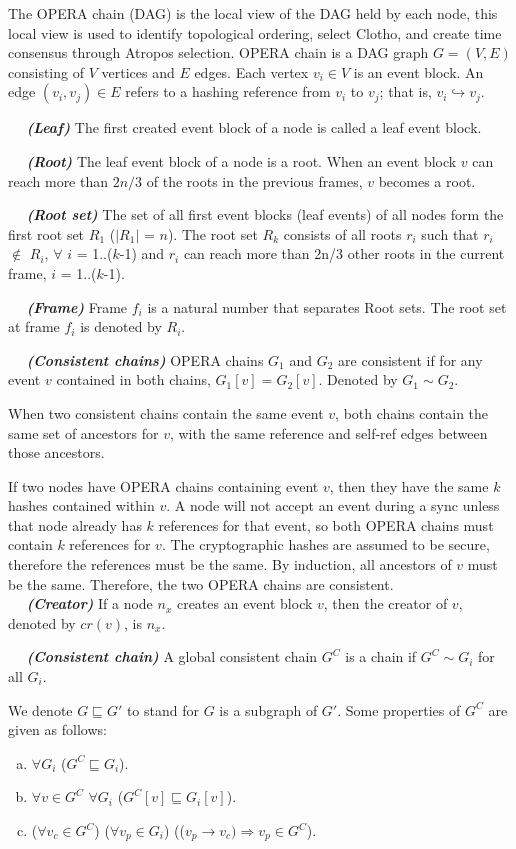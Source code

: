 \documentclass{article}
\newcommand{\dfnn}[2]{$\quad$ \textbf{\emph{(#1)}} {#2}}
\newcommand{\erefz}{\hookrightarrow}
\newcommand{\hbefore}{\rightarrow}
\begin{document}
The OPERA chain (DAG) is the local view of the DAG held by each node, this local view is used to identify topological ordering, select Clotho, and create time consensus through Atropos selection.
OPERA chain is a DAG graph $G = (V, E)$ consisting of $V$ vertices and $E$ edges. Each vertex $v_i \in V$ is an event block. An edge $(v_i,v_j) \in E$ refers to a hashing reference from $v_i$ to $v_j$; that is, $v_i \erefz v_j$.

\dfnn{Leaf}{The first created event block of a node is called a leaf event block.}

\dfnn{Root}{The leaf event block of a node is a root. When an event block $v$ can reach more than $2n/3$ of the roots in the previous frames, $v$ becomes a root.}

\dfnn{Root set}{The set of all first event blocks (leaf events) of all nodes form the first root set $R_1$ ($|R_1|$ = $n$). The root set $R_k$ consists of all roots $r_i$ such that $r_i$ $\not \in $ $R_i$, $\forall$ $i$ = 1..($k$-1) and $r_i$ can reach more than 2n/3 other roots in the current frame, $i$ = 1..($k$-1).}

\dfnn{Frame}{Frame $f_i$ is a natural number that separates Root sets. The root set at frame $f_i$ is denoted by $R_i$.}

\dfnn{Consistent chains}{OPERA chains $G_1$ and $G_2$ are consistent if for any event $v$ contained in both chains, $G_1[v] = G_2[v]$. Denoted by $G_1 \sim G_2$.}

When two consistent chains contain the same event $v$, both chains contain the same set of ancestors for $v$, with the same reference and self-ref edges between those ancestors.

If two nodes have OPERA chains containing event $v$, then they have the same $k$ hashes contained within $v$. A node will not accept an event during a sync unless that node already has $k$ references for that event, so both OPERA chains must contain $k$ references for $v$. The cryptographic hashes are assumed to be secure, therefore the references must be the same. By induction, all ancestors of $v$ must be the same. Therefore, the two OPERA chains are consistent.\\

\dfnn{Creator}{If a node $n_x$ creates an event block $v$, then the creator of $v$, denoted by $cr(v)$, is $n_x$.}

\dfnn{Consistent chain}{A global consistent chain $G^C$ is a chain if $G^C \sim G_i$ for all $G_i$.}

We denote $G \sqsubseteq G'$ to stand for $G$ is a subgraph of $G'$. Some properties of $G^C$ are given as follows:
\begin{enumerate}[(a)]
	\item $\forall G_i$ ($G^C \sqsubseteq G_i$).
	\item
	$\forall v \in G^C$ $\forall G_i$ ($G^C[v] \sqsubseteq G_i[v]$).
	\item
	($\forall v_c \in G^C$) ($\forall v_p \in G_i$) (($v_p \hbefore v_c) \Rightarrow v_p \in G^C$).
\end{enumerate}
\end{document}

